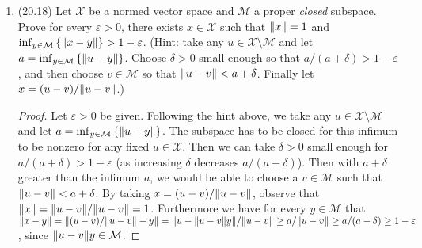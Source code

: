 \documentclass[11pt]{article}
\newcommand{\cbr}[1]{\left\{#1\right\}}
\begin{document}
\begin{enumerate}
\begin{enumerate}
\begin{proof}
        The sum $\sum_{i=1}^\infty \sum_{k=1}^n \abs{{x_i}_k} = \sum_{k=1}^n \sum_{i=1}^\infty \abs{{x_i}_k}$ converges (and the interchange of order of summation is okay since the original sum converged absolutely). It follows that each of the sums $\sum_{i=1}^\infty \abs{{x_i}_k}$ converge for $1\leq k\leq n$. But then $\sum_{i=1}^\infty {x_i}_k$ must converge as a result. Then $ \sum_{k=1}^n \sum_{i=1}^\infty {x_i}_k = \sum_{i=1}^\infty \sum_{k=1}^n {x_i}_k = \sum_{i=1}^\infty x_i$ must converge also (and again the interchange of order of summation is okay due to absolute convergence). It follows that $\mathcal{X}$ with the $\norm{\cdot}_1$-topology is complete. By Problem 20.2 it follows that $\mathcal{X}$ with any $\norm{\cdot}$-topology is also complete since all norms are equivalent (to the $\norm{\cdot}_1$-norm). Hence every finite dimensional normed vector space is complete.
      \end{proof}
      \item Let $\mathcal{X}$ be a normed vector space and $\mathcal{M}\subset \mathcal{X}$ a finite-dimensional subspace. Prove that $\mathcal{M}$ is closed in $\mathcal{X}$. \begin{proof}
        Every sequence from $\mathcal{M}$ converging in $\mathcal{X}$ is necessarily Cauchy. Then since finite dimensional spaces are complete, such sequences must converge in $\mathcal{M}$. So $\mathcal{M}$ contains all of its limit points, so it is closed.
      \end{proof}
    \end{enumerate}
    \item (20.18) Let $\mathcal{X}$ be a normed vector space and $\mathcal{M}$ a proper \textit{closed} subspace. Prove for every $\varepsilon>0$, there exists $x\in \mathcal{X}$ such that $\norm{x} = 1$ and $\inf_{y\in \mathcal{M}}\cbr{\norm{x-y}}>1-\varepsilon$. (Hint: take any $u\in \mathcal{X}\setminus \mathcal{M}$ and let $a = \inf_{y\in \mathcal{M}}\cbr{\norm{u-y}}$. Choose $\delta>0$ small enough so that $a/(a+\delta)>1-\varepsilon$, and then choose $v\in \mathcal{M}$ so that $\norm{u-v}<a+\delta$. Finally let $x = (u-v)/\norm{u-v}$.) \begin{proof} Let $\varepsilon>0$ be given.
      Following the hint above, we take any $u\in \mathcal{X}\setminus \mathcal{M}$ and let $a = \inf_{y\in \mathcal{M}}\cbr{\norm{u-y}}$. The subspace has to be closed for this infimum to be nonzero for any fixed $u\in\mathcal{X}$. Then we can take $\delta>0$ small enough for $a/(a+\delta)>1-\varepsilon$ (as increasing $\delta$ decreases $a/(a+\delta)$). Then with $a+\delta$ greater than the infimum $a$, we would be able to choose a $v\in \mathcal{M}$ such that $\norm{u-v}<a+\delta$. By taking $x = (u-v)/\norm{u-v}$, observe that $\norm{x} = \norm{u-v}/\norm{u-v} = 1$. Furthermore we have for every $y\in \mathcal{M}$ that $\norm{x-y} = \norm{(u-v)/\norm{u-v}-y} = \norm{u-\norm{u-v}y}/\norm{u-v}\geq a/\norm{u-v}\geq a/(a-\delta)\geq 1-\varepsilon$, since $\norm{u-v}y\in \mathcal{M}$.

\end{proof}
\end{enumerate}
\end{document}

